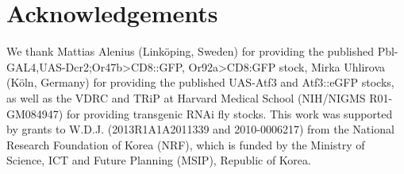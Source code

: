 \section*{Acknowledgements}

We thank Mattias Alenius (Link{\"{o}}ping, Sweden) for providing the published Pbl-GAL4,UAS-Dcr2;Or47b\textgreater{}CD8::GFP, Or92a\textgreater{}CD8:GFP stock, Mirka Uhlirova (K{\"{o}}ln, Germany) for providing the published UAS-Atf3 and Atf3::eGFP stocks, as well as the VDRC and TRiP at Harvard Medical School (NIH/NIGMS R01-GM084947) for providing transgenic RNAi fly stocks.
This work was supported by grants to W.D.J. (2013R1A1A2011339 and 2010-0006217) from the National Research Foundation of Korea (NRF), which is funded by the Ministry of Science, ICT and Future Planning (MSIP), Republic of Korea.